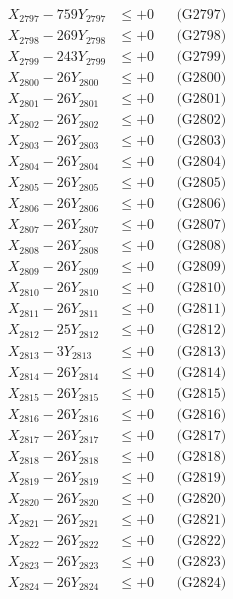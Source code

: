 \documentclass[a4paper,10pt]{article}
\begin{document}
{\begin{align}
X_{2797} - 759Y_{2797} &\leq +0 && \text{(G2797)} \\
X_{2798} - 269Y_{2798} &\leq +0 && \text{(G2798)} \\
X_{2799} - 243Y_{2799} &\leq +0 && \text{(G2799)} \\
X_{2800} - 26Y_{2800} &\leq +0 && \text{(G2800)} \\
\allowbreak
X_{2801} - 26Y_{2801} &\leq +0 && \text{(G2801)} \\
X_{2802} - 26Y_{2802} &\leq +0 && \text{(G2802)} \\
X_{2803} - 26Y_{2803} &\leq +0 && \text{(G2803)} \\
X_{2804} - 26Y_{2804} &\leq +0 && \text{(G2804)} \\
X_{2805} - 26Y_{2805} &\leq +0 && \text{(G2805)} \\
X_{2806} - 26Y_{2806} &\leq +0 && \text{(G2806)} \\
X_{2807} - 26Y_{2807} &\leq +0 && \text{(G2807)} \\
X_{2808} - 26Y_{2808} &\leq +0 && \text{(G2808)} \\
X_{2809} - 26Y_{2809} &\leq +0 && \text{(G2809)} \\
X_{2810} - 26Y_{2810} &\leq +0 && \text{(G2810)} \\
\allowbreak
X_{2811} - 26Y_{2811} &\leq +0 && \text{(G2811)} \\
X_{2812} - 25Y_{2812} &\leq +0 && \text{(G2812)} \\
X_{2813} - 3Y_{2813} &\leq +0 && \text{(G2813)} \\
X_{2814} - 26Y_{2814} &\leq +0 && \text{(G2814)} \\
X_{2815} - 26Y_{2815} &\leq +0 && \text{(G2815)} \\
X_{2816} - 26Y_{2816} &\leq +0 && \text{(G2816)} \\
X_{2817} - 26Y_{2817} &\leq +0 && \text{(G2817)} \\
X_{2818} - 26Y_{2818} &\leq +0 && \text{(G2818)} \\
X_{2819} - 26Y_{2819} &\leq +0 && \text{(G2819)} \\
X_{2820} - 26Y_{2820} &\leq +0 && \text{(G2820)} \\
\allowbreak
X_{2821} - 26Y_{2821} &\leq +0 && \text{(G2821)} \\
X_{2822} - 26Y_{2822} &\leq +0 && \text{(G2822)} \\
X_{2823} - 26Y_{2823} &\leq +0 && \text{(G2823)} \\
X_{2824} - 26Y_{2824} &\leq +0 && \text{(G2824)} \\

\end{align}}
\end{document}
